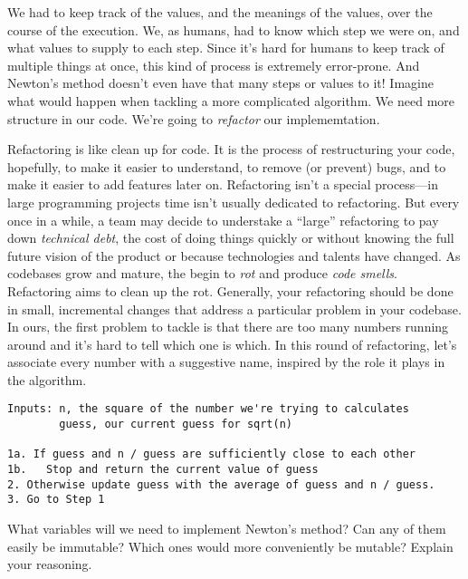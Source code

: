 We had to keep track of the values, and the meanings of the values, over the course of the execution. We, as humans, had to know which step we were on, and what values to supply to each step. Since it's hard for humans to keep track of multiple things at once, this kind of process is extremely error-prone. And Newton's method doesn't even have that many steps or values to it! Imagine what would happen when tackling a more complicated algorithm. We need more structure in our code. We're going to \emph{refactor} our implememtation.

Refactoring is like clean up for code. It is the process of restructuring your code, hopefully, to make it easier to understand, to remove (or prevent) bugs, and to make it easier to add features later on. Refactoring isn't a special process---in large programming projects time isn't usually dedicated to refactoring. But every once in a while, a team may decide to understake a ``large'' refactoring to pay down \emph{technical debt}, the cost of doing things quickly or without knowing the full future vision of the product or because technologies and talents have changed. As codebases grow and mature, the begin to \emph{rot} and produce \emph{code smells}. Refactoring aims to clean up the rot.
Generally, your refactoring should be done in small, incremental changes that address a particular problem in your codebase. In ours, the first problem to tackle is that there are too many numbers running around and it's hard to tell which one is which. In this round of refactoring, let's associate every number with a suggestive name, inspired by the role it plays in the algorithm.


\begin{lstlisting}[caption={Newton's method for calculating square roots, reprinted for your convenience.}]
Inputs: n, the square of the number we're trying to calculates
        guess, our current guess for sqrt(n)

1a. If guess and n / guess are sufficiently close to each other
1b.   Stop and return the current value of guess
2. Otherwise update guess with the average of guess and n / guess.
3. Go to Step 1
\end{lstlisting}

\begin{question}
  What variables will we need to implement Newton's method? Can any of them easily be immutable? Which ones would more conveniently be mutable? Explain your reasoning.
\end{question}

